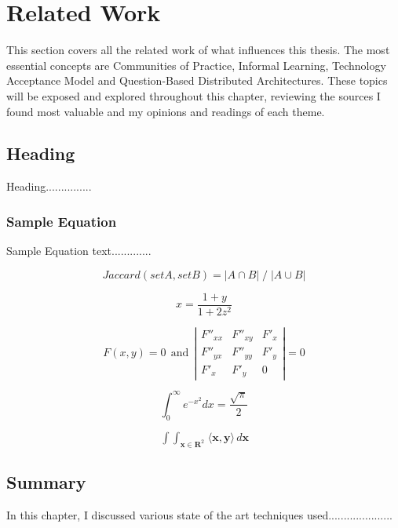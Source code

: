 \chapter{Related Work}
\label{cha:relatedwork}

This section covers all the related work of what influences this thesis.
The most essential concepts are Communities of Practice, Informal Learning, Technology Acceptance Model and Question-Based Distributed Architectures.
These topics will be exposed and explored throughout this chapter, reviewing the sources I found most valuable and my opinions and readings of each theme.

\section{Heading}

Heading...............

\subsection{Sample Equation}

Sample Equation text.............

\[ Jaccard (set A, set B)  =  |A \cap B| \; / \; |A \cup B|  \]


\[ x=\frac{1+y}{1+2z^2} \]


\[ F(x,y)=0 ~~\mbox{and}~~
\left| \begin{array}{ccc}
F''_{xx} & F''_{xy} &  F'_x \\
F''_{yx} & F''_{yy} &  F'_y \\
F'_x     & F'_y     & 0 
\end{array}\right| = 0 \]


\[ \int_0^\infty e^{-x^2} dx=\frac{\sqrt{\pi}}{2} \]


$$
\mathop{\int \!\!\! \int}_{\mathbf{x} \in \mathbf{R}^2} 
\! \langle \mathbf{x},\mathbf{y}\rangle 
\,d\mathbf{x}
$$



\section{Summary}

In this chapter, I discussed various state of the art techniques used.....................